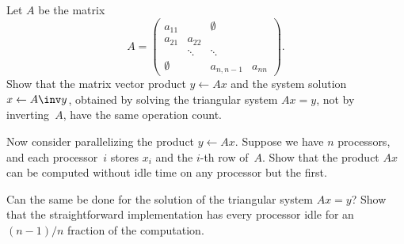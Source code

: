   Let $A$ be the matrix
  \begin{equation} A=
  \begin{pmatrix}
    a_{11}&&\emptyset\\ a_{21}&a_{22}\\ &\ddots&\ddots\\
    \emptyset&&a_{n,n-1}&a_{nn}
  \end{pmatrix}.\label{eq:ex:bidiagonal}
  \end{equation}
  Show that the matrix vector product $y\leftarrow Ax$ and the system
  solution $x\leftarrow A\inv y$, obtained by solving the
    triangular system $Ax=y$, not by inverting~$A$, have the same
  operation count.

  Now consider parallelizing the product $y\leftarrow Ax$. Suppose we
  have $n$ processors, and each processor~$i$ stores $x_i$ and the
  $i$-th row of~$A$. Show that the product $Ax$ can be computed without
  idle time on any processor but the first.

  Can the same be done for the solution of the triangular system
  $Ax=y$? Show that the straightforward implementation has every
  processor idle for an $(n-1)/n$ fraction of the computation.
